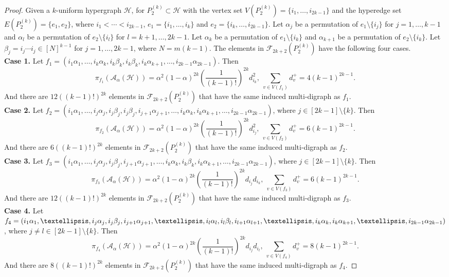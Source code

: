 \documentclass[10pt,a4paper]{amsart}
\begin{document}
\begin{proof}
Given a $k$-uniform hypergraph $\mathcal{H}$, for $P_{2}^{(k)}\subset \mathcal{H}$ with the vertex set $V(P_{2}^{(k)})=\{i_1,\ldots,i_{2k-1}\}$ and the hyperedge set $E(P_2^{(k)})=\{ e_1, e_2 \}$, where $i_1<\cdots<i_{2k-1}$, $e_1=\{i_1,\ldots,i_k\}$ and $e_2=\{i_k,\ldots,i_{2k-1}\}$.
Let $\alpha_j$ be a permutation of $e_1 \setminus\{i_j\}$ for $j=1,\ldots,k-1$ and $\alpha_l$ be a permutation of $e_2 \setminus\{i_l\}$ for $l=k+1,\ldots,2k-1$.
Let $\alpha_k$ be a permutation of $e_1 \setminus\{i_k\}$ and $\alpha_{k+1}$ be a permutation of $e_2 \setminus\{i_k\}$.
Let $\beta_j=i_j\cdots i_j\in[N]^{k-1}$ for $j=1,\ldots,2k-1$, where $N=m(k-1)$.
The elements in $\mathcal{F}_{2k+2}(P_{2}^{(k)})$ have the following four cases.\\
\textbf{Case 1.} Let $f_1=(i_1\alpha_1,\ldots,i_k\alpha_k,i_k\beta_k,i_k\beta_k,i_k\alpha_{k+1},\ldots,i_{2k-1}\alpha_{2k-1})$.
Then $$\pi_{f_1}(\mathcal{A}_{\alpha}(\mathcal{H}))=\alpha^2(1-\alpha)^{2k}\left( \frac{1}{(k-1)!} \right)^{2k}d_{i_k}^{2},~ \sum_{v\in V(f_1)}d_v^{+}=4(k-1)^{2k-1}.$$
And there are $12((k-1)!)^{2k}$ elements in $\mathcal{F}_{2k+2}(P_{2}^{(k)})$ that have the same induced multi-digraph as $f_1$.\\
\textbf{Case 2.} Let $f_2=(i_1\alpha_1,\ldots,i_j\alpha_j,i_j\beta_j,i_j\beta_j,i_{j+1}\alpha_{j+1},\ldots,i_k\alpha_k,i_k\alpha_{k+1},\ldots,i_{2k-1}\alpha_{2k-1})$, where $j\in[2k-1]\setminus\{k\}$. Then $$\pi_{f_2}(\mathcal{A}_{\alpha}(\mathcal{H}))=\alpha^2(1-\alpha)^{2k}\left( \frac{1}{(k-1)!} \right)^{2k}d_{i_j}^{2},~ \sum_{v\in V(f_2)}d_v^{+}=6(k-1)^{2k-1}.$$
And there are $6((k-1)!)^{2k}$ elements in $\mathcal{F}_{2k+2}(P_{2}^{(k)})$ that have the same induced multi-digraph as $f_2$.\\
\textbf{Case 3.} Let $f_3=(i_1\alpha_1,\ldots,i_j\alpha_j,i_j\beta_j,i_{j+1}\alpha_{j+1},\ldots,i_k\alpha_k,i_k\beta_k,i_k\alpha_{k+1},\ldots,i_{2k-1}\alpha_{2k-1})$, where $j\in[2k-1]\setminus\{k\}$. Then $$\pi_{f_3}(\mathcal{A}_{\alpha}(\mathcal{H}))=\alpha^2(1-\alpha)^{2k}\left( \frac{1}{(k-1)!} \right)^{2k}d_{i_j}d_{i_k},~ \sum_{v\in V(f_3)}d_v^{+}=6(k-1)^{2k-1}.$$
And there are $12((k-1)!)^{2k}$ elements in $\mathcal{F}_{2k+2}(P_{2}^{(k)})$ that have the same induced multi-digraph as $f_3$.\\
\textbf{Case 4.} Let $f_4=(i_1\alpha_1,\ldots,i_j\alpha_j,i_j\beta_j,i_{j+1}\alpha_{j+1},\ldots,i_l\alpha_l,i_l\beta_l,i_{l+1}\alpha_{l+1},\ldots,i_k\alpha_k, i_k\alpha_{k+1},\\ \ldots,i_{2k-1}\alpha_{2k-1})$, where $j\ne l\in[2k-1]\setminus\{k\}$. Then $$\pi_{f_4}(\mathcal{A}_{\alpha}(\mathcal{H}))=\alpha^2(1-\alpha)^{2k}\left( \frac{1}{(k-1)!} \right)^{2k}d_{i_j}d_{i_l},~ \sum_{v\in V(f_4)}d_v^{+}=8(k-1)^{2k-1}.$$
And there are $8((k-1)!)^{2k}$ elements in $\mathcal{F}_{2k+2}(P_{2}^{(k)})$ that have the same induced multi-digraph as $f_4$.


\end{proof}
\end{document}
